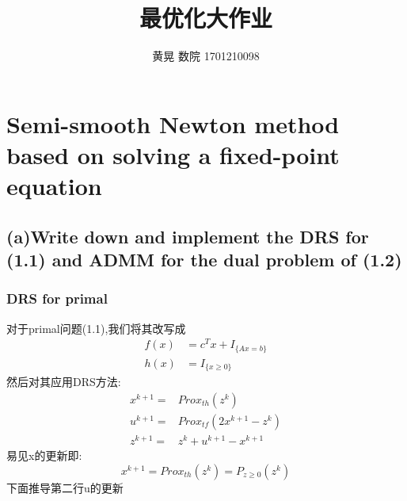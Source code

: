 \documentclass[UTF8]{ctexart}
\author{黄晃 数院 1701210098 }
\title{最优化大作业}
\begin{document}
  \maketitle


\section{Semi-smooth Newton method based on solving a fixed-point equation}
\subsection{(a)Write down and implement the DRS for (1.1) and ADMM for the dual problem of (1.2)}
\subsubsection{DRS for primal}
对于primal问题(1.1),我们将其改写成
\begin{align*}
  f(x) & = c^Tx + I_{\{Ax=b\}} \\
  h(x) & = I_{\{x\geq 0\}}
\end{align*}
然后对其应用DRS方法:
\begin{equation}
  \begin{split}
     x^{k+1} =& Prox_{th}(z^k)\\
      u^{k+1}= & Prox_{tf}(2x^{k+1}-z^k)\\
       z^{k+1}=& z^k+u^{k+1}-x^{k+1}
  \end{split}
\end{equation}
易见x的更新即:
$$
x^{k+1} = Prox_{th}(z^k) = P_{z\geq 0}(z^k)
$$
下面推导第二行u的更新
\end{document}

